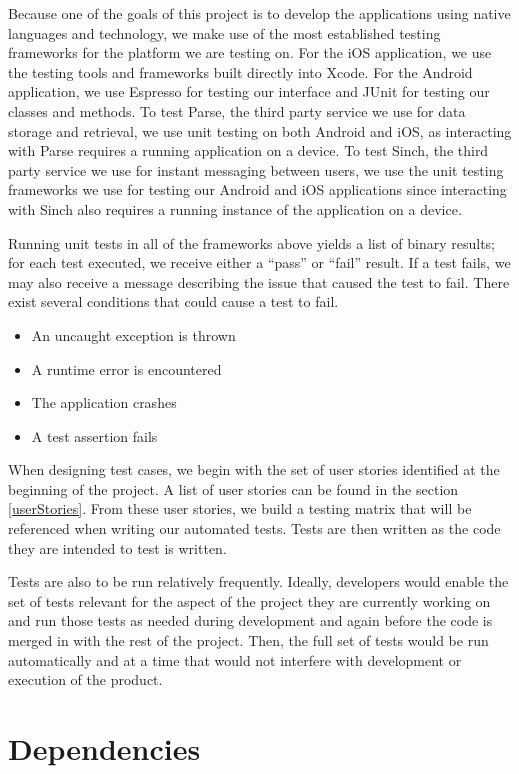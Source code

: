 Because one of the goals of this project is to develop the applications using
native languages and technology, we make use of the most established testing
frameworks for the platform we are testing on. For the iOS application, we use
the testing tools and frameworks built directly into Xcode. For the Android
application, we use Espresso for testing our interface and JUnit for testing our
classes and methods. To test Parse, the third party service we use for data
storage and retrieval, we use unit testing on both Android and iOS, as
interacting with Parse requires a running application on a device. To test
Sinch, the third party service we use for instant messaging between users, we
use the unit testing frameworks we use for testing our Android and iOS
applications since interacting with Sinch also requires a running instance of
the application on a device.

Running unit tests in all of the frameworks above yields a list of binary
results; for each test executed, we receive either a ``pass'' or ``fail''
result. If a test fails, we may also receive a message describing the issue
that caused the test to fail. There exist several conditions that could cause
a test to fail.

\begin{itemize}
	\item An uncaught exception is thrown
	\item A runtime error is encountered
	\item The application crashes
	\item A test assertion fails
\end{itemize}

When designing test cases, we begin with the set of user stories identified at
the beginning of the project. A list of user stories can be found in the section
\ref{userStories}. From these user stories, we build a testing matrix that will
be referenced when writing our automated tests. Tests are then written as the
code they are intended to test is written.

Tests are also to be run relatively frequently. Ideally, developers would enable
the set of tests relevant for the aspect of the project they are currently
working on and run those tests as needed during development and again before the
code is merged in with the rest of the project. Then, the full set of tests
would be run automatically and at a time that would not interfere with
development or execution of the product.


\section{Dependencies}

